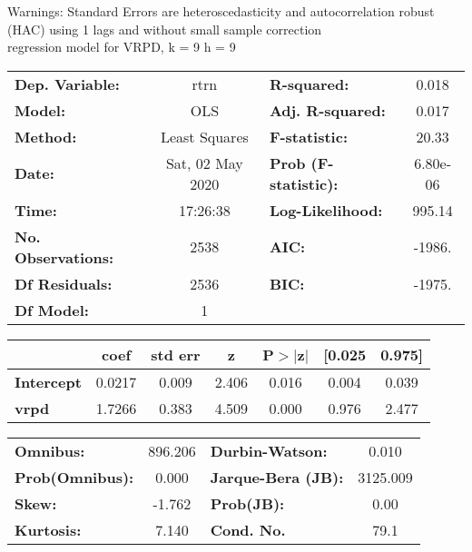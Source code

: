 Warnings: \newline
 [1] Standard Errors are heteroscedasticity and autocorrelation robust (HAC) using 1 lags and without small sample correction\\ 

regression model for VRPD, k = 9 h = 9\begin{center}
\begin{tabular}{lclc}
\toprule
\textbf{Dep. Variable:}    &       rtrn       & \textbf{  R-squared:         } &     0.018   \\
\textbf{Model:}            &       OLS        & \textbf{  Adj. R-squared:    } &     0.017   \\
\textbf{Method:}           &  Least Squares   & \textbf{  F-statistic:       } &     20.33   \\
\textbf{Date:}             & Sat, 02 May 2020 & \textbf{  Prob (F-statistic):} &  6.80e-06   \\
\textbf{Time:}             &     17:26:38     & \textbf{  Log-Likelihood:    } &    995.14   \\
\textbf{No. Observations:} &        2538      & \textbf{  AIC:               } &    -1986.   \\
\textbf{Df Residuals:}     &        2536      & \textbf{  BIC:               } &    -1975.   \\
\textbf{Df Model:}         &           1      & \textbf{                     } &             \\
\bottomrule
\end{tabular}
\begin{tabular}{lcccccc}
                   & \textbf{coef} & \textbf{std err} & \textbf{z} & \textbf{P$> |$z$|$} & \textbf{[0.025} & \textbf{0.975]}  \\
\midrule
\textbf{Intercept} &       0.0217  &        0.009     &     2.406  &         0.016        &        0.004    &        0.039     \\
\textbf{vrpd}      &       1.7266  &        0.383     &     4.509  &         0.000        &        0.976    &        2.477     \\
\bottomrule
\end{tabular}
\begin{tabular}{lclc}
\textbf{Omnibus:}       & 896.206 & \textbf{  Durbin-Watson:     } &    0.010  \\
\textbf{Prob(Omnibus):} &   0.000 & \textbf{  Jarque-Bera (JB):  } & 3125.009  \\
\textbf{Skew:}          &  -1.762 & \textbf{  Prob(JB):          } &     0.00  \\
\textbf{Kurtosis:}      &   7.140 & \textbf{  Cond. No.          } &     79.1  \\
\bottomrule
\end{tabular}
\end{center}

